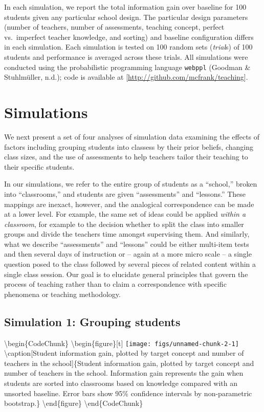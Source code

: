 \documentclass[10pt, letterpaper]{article}
\begin{document}
In each simulation, we report the total information gain over baseline
for 100 students given any particular school design. The particular
design parameters (number of teachers, number of assessments, teaching
concept, perfect vs.~imperfect teacher knowledge, and sorting) and
baseline configuration differs in each simulation. Each simulation is
tested on 100 random sets (\emph{trial}s) of 100 students and
performance is averaged across these trials. All simulations were
conducted using the probabilistic programming language \texttt{webppl}
(Goodman \& Stuhlmüller, n.d.); code is available at
{[}\url{http://github.com/mcfrank/teaching}{]}.

\section{Simulations}\label{simulations}

We next present a set of four analyses of simulation data examining the
effects of factors including grouping students into classess by their
prior beliefs, changing class sizes, and the use of assessments to help
teachers tailor their teaching to their specific students.

In our simulations, we refer to the entire group of students as a
``school,'' broken into ``classrooms,'' and students are given
``assessments'' and ``lessons.'' These mappings are inexact, however,
and the analogical correspondence can be made at a lower level. For
example, the same set of ideas could be applied \emph{within a
classroom}, for example to the decision whether to split the class into
smaller groups and divide the teachers time amongst supervising them.
And similarly, what we describe ``assessments'' and ``lessons'' could be
either multi-item tests and then several days of instruction or -- again
at a more micro scale -- a single question posed to the class followed
by several pieces of related content within a single class session. Our
goal is to elucidate general principles that govern the process of
teaching rather than to claim a correspondence with specific phenomena
or teaching methodology.

\subsection{Simulation 1: Grouping
students}\label{simulation-1-grouping-students}

\textbackslash{}begin\{CodeChunk\}
\textbackslash{}begin\{figure\}{[}t{]}
\texttt{[image: figs/unnamed-chunk-2-1]}
\textbackslash{}caption{[}Student information gain, plotted by target
concept and number of teachers in the school{]}\{Student information
gain, plotted by target concept and number of teachers in the school.
Information gain represents the gain when students are sorted into
classrooms based on knowledge compared with an unsorted baseline. Error
bars show 95\% confidence intervals by non-parametric
bootstrap.\}\label{fig:unnamed-chunk-2} \textbackslash{}end\{figure\}
\textbackslash{}end\{CodeChunk\}
\end{document}

